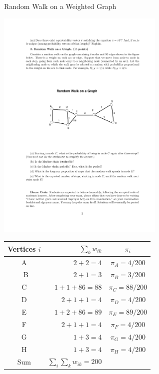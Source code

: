 \documentclass[letterpaper, mathserif]{beamer}
\begin{document}
\begin{frame}{Random Walk on a Weighted Graph}
\begin{center}
\includegraphics[width=0.6\textwidth]{WeightedGraph}

\small
\begin{tabular}{crc}
Vertices $i$ & $\sum_k w_{ik}$ & $\pi_i$\\\hline
A & $2+2=4$     & $\pi_A=4/200$\\\
B & $2+1=3$     & $\pi_B=3/200$\\
C & $1+1+86=88$ & $\pi_C=88/200$\\
D & $2+1+1=4$   & $\pi_D=4/200$\\
E & $1+2+86=89$ & $\pi_E=89/200$\\
F & $2+1+1=4$   & $\pi_F=4/200$\\
G & $1+3=4$     & $\pi_G=4/200$\\
H & $1+3=4$     & $\pi_H=4/200$\\\hline
Sum &$\sum_i\sum_k w_{ik}=200$ &
\end{tabular}
\end{center}
\end{frame}
\end{document}

